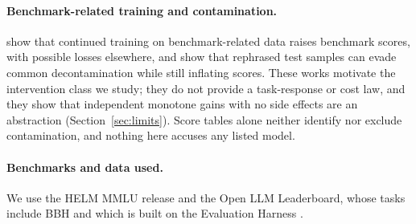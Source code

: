\paragraph{Benchmark-related training and contamination.}
\citet{zhou2023cheater} show that continued training on benchmark-related data raises benchmark scores, with possible losses elsewhere, and \citet{yang2023rephrased} show that rephrased test samples can evade common decontamination while still inflating scores.
These works motivate the intervention class we study; they do not provide a task-response or cost law, and they show that independent monotone gains with no side effects are an abstraction (Section~\ref{sec:limits}).
Score tables alone neither identify nor exclude contamination, and nothing here accuses any listed model.

\paragraph{Benchmarks and data used.}
We use the HELM MMLU release \citep{liang2023helm,hendrycks2021mmlu} and the Open LLM Leaderboard, whose tasks include BBH \citep{suzgun2022bbh} and which is built on the Evaluation Harness \citep{sutawika2023harness}.
